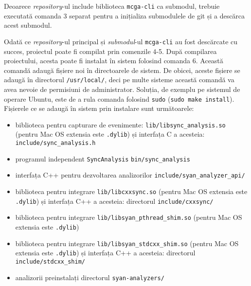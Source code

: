 Deoarece \textit{repository}-ul include biblioteca
\lstinline{mcga-cli}\cite{mcga-cli} ca submodul, trebuie executată
comanda 3 separat pentru a inițializa submodulele de git și a descărca
acest submodul.

Odată ce \textit{repository}-ul principal și \textit{submodul}-ul
\lstinline{mcga-cli} au fost descărcate cu succes, proiectul poate fi
compilat prin comenzile 4-5. După compilarea proiectului, acesta poate
fi instalat în sistem folosind comanda 6. Această comandă adaugă fișiere
noi în directoarele de sistem. De obicei, aceste fișiere se adaugă în
directorul \lstinline{/usr/local/}, deci pe multe sisteme această
comandă va avea nevoie de permisiuni de administrator. Soluția, de
exemplu pe sistemul de operare Ubuntu, este de a rula comanda folosind
\lstinline{sudo} (\lstinline{sudo make install}). Fișierele ce se adaugă
în sistem prin instalare sunt următoarele:

\begin{itemize}
    \item biblioteca pentru capturare de evenimente:
    \lstinline{lib/libsync_analysis.so} (pentru Mac OS extensia este
    \lstinline{.dylib}) și interfața C a acesteia:
    \lstinline{include/sync_analysis.h}
    \item programul independent \lstinline{SyncAnalysis}
    \lstinline{bin/sync_analysis}
    \item interfața C++ pentru dezvoltarea analizorilor
    \lstinline{include/syan_analyzer_api/}
    \item biblioteca pentru integrare \lstinline{lib/libcxxsync.so}
    (pentru Mac OS extensia este \lstinline{.dylib}) și interfața C++ a
    acesteia: directorul \lstinline{include/cxxsync/}
    \item biblioteca pentru integrare
    \lstinline{lib/libsyan_pthread_shim.so} (pentru Mac OS extensia este
    \lstinline{.dylib})
    \item biblioteca pentru integrare
    \lstinline{lib/libsyan_stdcxx_shim.so} (pentru Mac OS extensia
    este \lstinline{.dylib}) și interfața C++ a acesteia: directorul
    \lstinline{include/stdcxx_shim/}
    \item analizorii preinstalați directorul \lstinline{syan-analyzers/}
\end{itemize}
